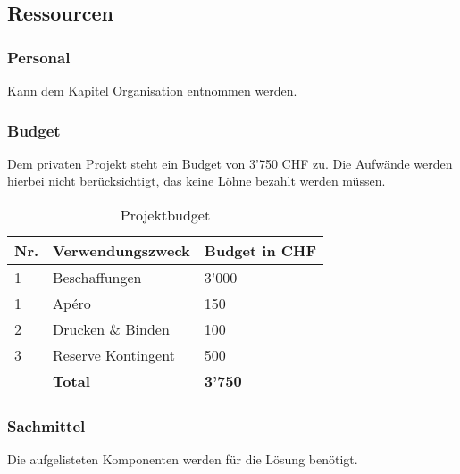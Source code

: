 \subsection{Ressourcen}

\subsubsection{Personal}
Kann dem Kapitel Organisation entnommen werden.

\subsubsection{Budget}
Dem privaten Projekt steht ein Budget von 3'750 CHF zu. Die Aufwände werden hierbei nicht berücksichtigt, das keine Löhne bezahlt werden müssen.
\begin{table}[H]
\centering
\begin{tabular}[t]{p{1cm}p{5cm}p{2cm}}
\hline
\rowcolor{heading}\textbf{Nr.} & \textbf{Verwendungszweck} & \textbf{Budget \newline in CHF} \\\hline
1 & Beschaffungen & 3'000 \\\hline
1 & Apéro & 150 \\\hline
2 & Drucken \& Binden & 100 \\\hline
3 & Reserve Kontingent & 500 \\\hline
\textbf{} & \textbf{Total} & \textbf{3'750}  \\\hline
\end{tabular}
\caption{Projektbudget}
\end{table}

\subsubsection{Sachmittel}
Die aufgelisteten Komponenten werden für die Lösung benötigt.


